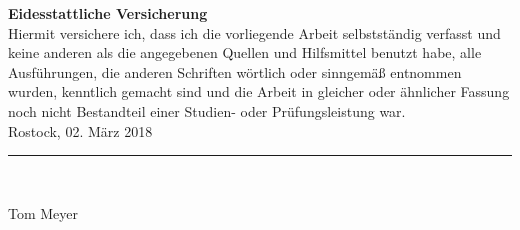 \documentclass[	english,
    ]{WissTemplate}
\renewcommand{\name}{Tom Meyer}
\begin{document}

\frontmatter

\tableofcontents
\newpage
\markright{\nomname}
\printnomenclature
{}
\mainmatter











%
% 

\newpage
\thispagestyle{empty}
\label{EidesstattlicheVersicherung}
\vspace*{8cm}%
{\parindent 0pt
    \textbf{\Huge{Eidesstattliche Versicherung}}\vspace{10mm}\\
    Hiermit versichere ich, dass ich die vorliegende Arbeit selbstständig verfasst und keine anderen als die angegebenen Quellen und Hilfsmittel benutzt habe, alle Ausführungen, die anderen Schriften wörtlich oder sinngemäß entnommen wurden, kenntlich gemacht sind und die Arbeit in gleicher oder ähnlicher Fassung noch nicht Bestandteil einer Studien- oder Prüfungsleistung war.
    \\[2cm]}
Rostock, 02. März 2018
\\[3cm]
\rule{6cm}{0.5pt}\\
\parbox[l][1cm][c]{6cm}{\hfill\name\hfill\vbox{}}
\end{document}
